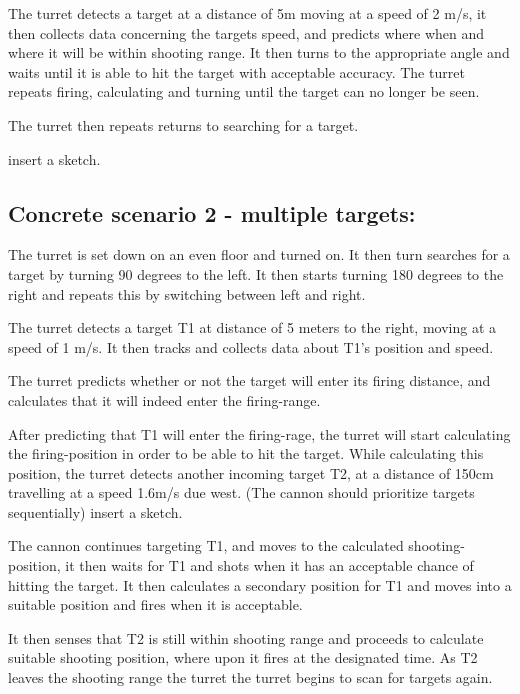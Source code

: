 The turret detects a target at a distance of 5m moving at a speed of 2 m/s, it
then collects data concerning the targets speed, and predicts where when and
where it will be within shooting range. It then turns to the appropriate angle
and waits until it is able to hit the target with acceptable accuracy. The
turret repeats firing, calculating and turning until the target can no longer
be seen.\nl

The turret then repeats returns to searching for a target.\nl



insert a sketch.
\subsection{Concrete scenario 2 - multiple targets:}

The turret is set down on an even floor and turned on. It then turn searches
for a target by turning 90 degrees to the left. It then starts turning 180
degrees to the right and repeats this by switching between left and right.\nl

The turret detects a target T1 at distance of 5 meters to the right, moving at
a speed of 1 m/s. It then tracks and collects data about T1's position and
speed.\nl

The turret predicts whether or not the target will enter its firing distance,
and calculates that it will indeed enter the firing-range.\nl

After predicting that T1 will enter the firing-rage, the turret will start
calculating the firing-position in order to be able to hit the target. While
calculating this position, the turret detects another incoming target T2, at a
distance of 150cm travelling at a speed 1.6m/s due west. (The cannon should
prioritize targets sequentially) insert a sketch.\nl

The cannon continues targeting T1, and moves to the calculated
shooting-position, it then waits for T1 and shots when it has an acceptable
chance of hitting the target. It then calculates a secondary position for T1
and moves into a suitable position and fires when it is acceptable.\nl

It then senses that T2 is still within shooting range and proceeds to calculate
suitable shooting position, where upon it fires at the designated time. As T2
leaves the shooting range the turret the turret begins to scan for targets
again.\nl

